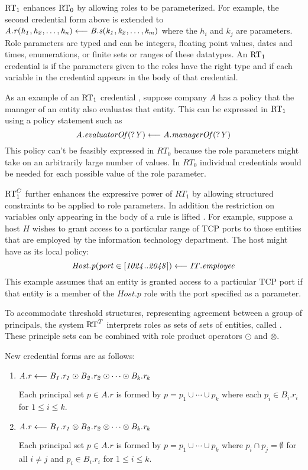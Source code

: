 $\text{RT}_1$ enhances $\text{RT}_0$ by allowing roles to be parameterized. For example, the second
credential form above is extended to $\mathit{A.r(h_1, h_2, \ldots, h_n)} \stackrel{}{\longleftarrow} \mathit{B.s(k_1, k_2, \ldots,
  k_m)}$ where the $h_i$ and $k_j$ are parameters. Role parameters are typed and can be
integers, floating point values, dates and times, enumerations, or finite sets or ranges of
these datatypes. An $\text{RT}_1$ credential is  if the parameters given to the
roles have the right type and if each variable in the credential appears in the body of that
credential.

As an example of an $\text{RT}_1$ credential \cite{Li:DRBTMF}, suppose company $A$ has a policy that
the manager of an entity also evaluates that entity. This can be expressed in $\text{RT}_1$ using a
policy statement such as
\begin{displaymath}
\mathit{A.\mathit{evaluatorOf}(?Y)} \stackrel{}{\longleftarrow} \mathit{A.\mathit{managerOf(?Y)}}
\end{displaymath}
This policy can't be feasibly expressed in $RT_0$ because the role parameters might take on an
arbitrarily large number of values. In $RT_0$ individual credentials would be needed for each
possible value of the role parameter.

$\text{RT}_1^C$ further enhances the expressive power of $RT_1$ by allowing structured constraints to
be applied to role parameters. In addition the restriction on variables only appearing in the
body of a rule is lifted \cite{Li:DCFTML,Li:RRBTMF}. For example, suppose a host $H$ wishes to
grant access to a particular range of TCP ports to those entities that are employed by the
information technology department. The host might have as its local policy:
\begin{displaymath}
\mathit{\mathit{Host}.p(\mathit{port} \in
  [1024..2048])} \stackrel{}{\longleftarrow} \mathit{\mathit{IT}.\mathit{employee}}
\end{displaymath}
This example assumes that an entity is granted access to a particular TCP port if that entity is
a member of the $\mathit{Host}.p$ role with the port specified as a parameter.

To accommodate threshold structures, representing agreement between a group of principals, the
system $\text{RT}^T$ interprets roles as sets of sets of entities, called .
These principle sets can be combined with role product operators $\odot$ and $\otimes$.

New credential forms are as follows:
\begin{enumerate}

\item $\mathit{A.r} \stackrel{}{\longleftarrow} \mathit{B_1.r_1 \odot B_2.r_2 \odot \cdots \odot B_k.r_k}$ 

  Each principal set $p \in A.r$ is formed by $p = p_1 \cup \cdots \cup p_k$ where each $p_i \in
  B_i.r_i$ for $1 \le i \le k$.

\item $\mathit{A.r} \stackrel{}{\longleftarrow} \mathit{B_1.r_1 \otimes B_2.r_2 \otimes \cdots \otimes B_k.r_k}$ 

  Each principal set $p \in A.r$ is formed by $p = p_1 \cup \cdots \cup p_k$ where $p_i \cap p_j
  = \emptyset$ for all $i \ne j$ and $p_i \in B_i.r_i$ for $1 \le i \le k$.

\end{enumerate}

